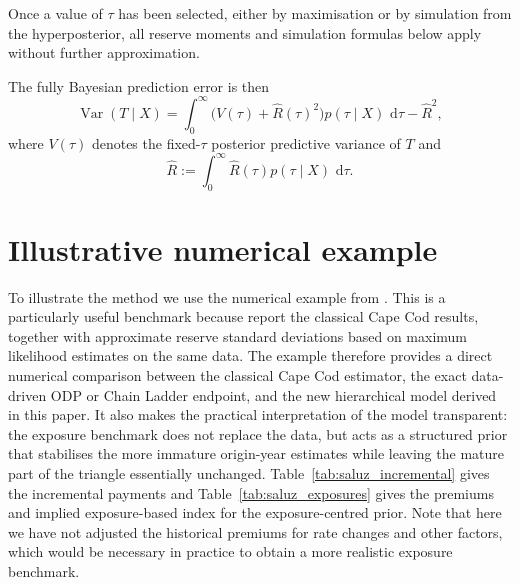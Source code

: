 \documentclass[11pt]{article}
\newcommand{\Var}{\operatorname{Var}}
\newcommand{\dd}{\,\mathrm{d}}
\newcommand{\1}{\mathbf{1}}
\begin{document}
Once a value of $\tau$ has been selected, either by maximisation or by simulation from the hyperposterior, all reserve moments and simulation formulas below apply without further approximation.



The fully Bayesian prediction error is then
\begin{equation}
\Var(T\mid X)
=
\int_0^{\infty}\bigl(V(\tau)+\widehat{R}(\tau)^2\bigr)p(\tau\mid X)\,\dd\tau
-\widehat{R}^2,
\label{eq:full_bayes_var_total}
\end{equation}
where $V(\tau)$ denotes the fixed-$\tau$ posterior predictive variance of $T$ and
\begin{equation}
\widehat R:=\int_0^{\infty}\widehat R(\tau)p(\tau\mid X)\,\dd\tau.
\label{eq:full_bayes_mean_total}
\end{equation}



\section{Illustrative numerical example}\label{sec:example}

To illustrate the method we use the numerical example from  \citet{Saluz2015CapeCod}. This is a particularly useful benchmark because \citet{Saluz2015CapeCod} report 
the classical Cape Cod results, together with approximate reserve standard deviations based on maximum likelihood estimates on the same data. 
The example therefore provides a direct numerical comparison between the classical Cape Cod estimator, the exact data-driven ODP or Chain Ladder endpoint, and the new hierarchical model derived in this paper. It also makes the practical interpretation of the model transparent: the exposure benchmark does not replace the data, but acts as a structured prior that stabilises the more immature origin-year estimates while leaving the mature part of the triangle essentially unchanged.
 Table~\ref{tab:saluz_incremental} gives the incremental payments and Table~\ref{tab:saluz_exposures} gives the 
premiums and implied exposure-based index for the exposure-centred prior. Note that here we have not adjusted the historical premiums for rate changes and other factors, which
would be necessary in practice to obtain a more realistic exposure benchmark. 
\end{document}
